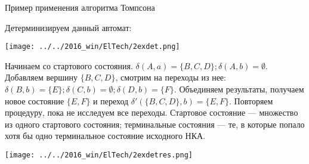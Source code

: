 \documentclass[12pt]{article}
\begin{document}
{\newpage

\begin{center} \Large{Пример применения алгоритма Томпсона}
\end{center}

\bigskip

Детерминизируем данный автомат: 

\texttt{[image: ../../2016\_win/ElTech/2exdet.png]}

Начинаем со стартового состояния. $\delta(A, a) = \{B, C, D\}; \delta(A, b) = \emptyset$. Добавляем вершину $\{B, C, D\}$, смотрим на переходы из нее: $\delta(B, b) = \{E\}; \delta(C, b) = \emptyset; \delta(D, b) = \{ F\}$. Объединяем результаты, получаем новое состояние $\{ E, F\}$ и переход $\delta'(\{B,C,D\}, b) = \{E, F\}$. Повторяем процедуру, пока не исследуем все переходы. Стартовое состояние --- множество из одного стартового состояния; терминальные состояния --- те, в которые попало хотя бы одно терминальное состояние исходного НКА.

\texttt{[image: ../../2016\_win/ElTech/2exdetres.png]}

}
\end{document}

